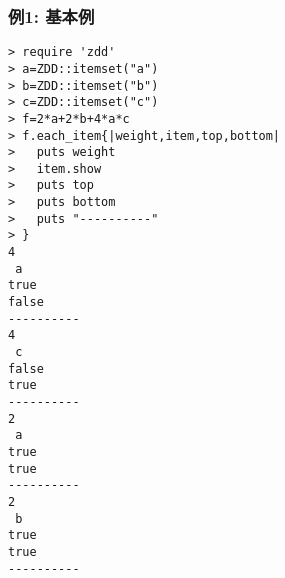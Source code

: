 \subsubsection*{例1: 基本例}



\begin{Verbatim}[baselinestretch=0.7,frame=single]
> require 'zdd'
> a=ZDD::itemset("a")
> b=ZDD::itemset("b")
> c=ZDD::itemset("c")
> f=2*a+2*b+4*a*c
> f.each_item{|weight,item,top,bottom|
>   puts weight
>   item.show
>   puts top
>   puts bottom
>   puts "----------"
> }
4
 a
true
false
----------
4
 c
false
true
----------
2
 a
true
true
----------
2
 b
true
true
----------
\end{Verbatim}
